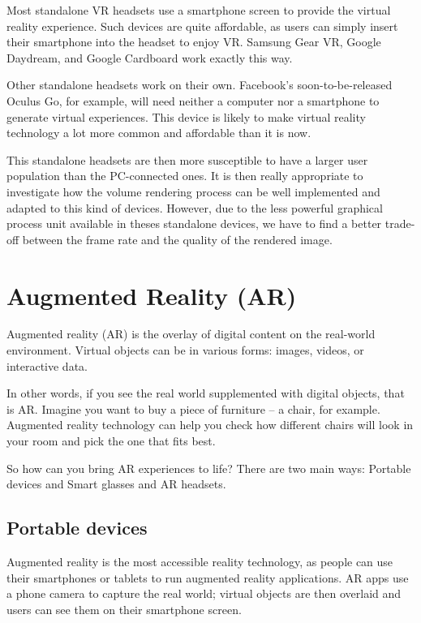 Most standalone VR headsets use a smartphone screen to provide the virtual reality experience. Such devices are quite affordable, as users can simply insert their smartphone into the headset to enjoy VR. Samsung Gear VR, Google Daydream, and Google Cardboard work exactly this way.

Other standalone headsets work on their own. Facebook's soon-to-be-released Oculus Go, for example, will need neither a computer nor a smartphone to generate virtual experiences. This device is likely to make virtual reality technology a lot more common and affordable than it is now.

This standalone headsets are then more susceptible to have a larger user population than the PC-connected ones. It is then really appropriate to investigate how the volume rendering process can be well implemented and adapted to this kind of devices. However, due to the less powerful graphical process unit available in theses standalone devices, we have to find a better trade-off between the frame rate and the quality of the rendered image. 


\section{ Augmented Reality (AR)}

Augmented reality (AR) is the overlay of digital content on the real-world environment. Virtual objects can be in various forms: images, videos, or interactive data.


In other words, if you see the real world supplemented with digital objects, that is AR. Imagine you want to buy a piece of furniture – a chair, for example. Augmented reality technology can help you check how different chairs will look in your room and pick the one that fits best.


So how can you bring AR experiences to life? There are two main ways: Portable devices and Smart glasses and AR headsets. 


\subsection{Portable devices}

Augmented reality is the most accessible reality technology, as people can use their smartphones or tablets to run augmented reality applications. AR apps use a phone camera to capture the real world; virtual objects are then overlaid and users can see them on their smartphone screen.


